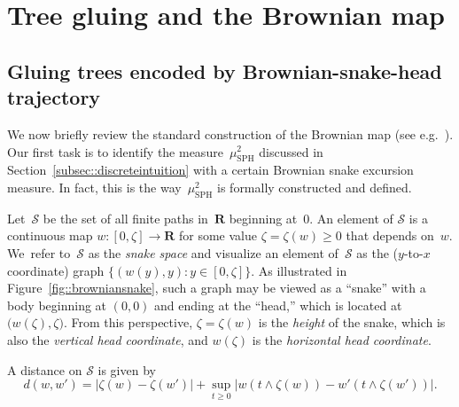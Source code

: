 \documentclass[JEP,XML,SOM,Unicode]{cedram}
\let\mathcal\mathscr
\let\oldS\S
\theoremstyle{plain}
\numberwithin{theorem}{section}
\theoremstyle{definition}
\newcommand{\snake}{{\mathcal S}}
\newcommand{\R}{\mathbf{R}}
\renewcommand{\S}{{\mathbf S}}
\newcommand{\mustwo}{\mu_{\mathrm{SPH}}^2}
\begin{document}
\section{Tree gluing and the Brownian map}
\label{sec::brownianmap}

\subsection{Gluing trees encoded by Brownian-snake-head trajectory}
\label{subsec::spheresassymetric}

We now briefly review the standard construction of the Brownian map (see e.g.\ \cite[\oldS 3.4]{legall2014icm}). Our first task is to identify the measure~$\mustwo$ discussed in Section~\ref{subsec::discreteintuition} with a certain Brownian snake excursion measure. In fact, this is the way~$\mustwo$ is formally constructed and defined.

Let~$\snake$ be the set of all finite paths in~$\R$ beginning at~$0$. An element of $\snake$ is a continuous map $w \colon [0, \zeta] \to \R$ for some value $\zeta = \zeta(w) \geq 0$ that depends on~$w$. We~refer to~$\snake$ as the \emph{snake space} and visualize an element of~$\snake$ as the ($y$-to-$x$ coordinate) graph $\{ (w(y), y): y \in [0,\zeta] \}$. As illustrated in Figure~\ref{fig::browniansnake}, such a graph may be viewed as a ``snake'' with a body beginning at $(0,0)$ and ending at the ``head,'' which is located at $\bigl(w(\zeta), \zeta \bigr)$. From this perspective, $\zeta = \zeta(w)$ is the \emph{height} of the snake, which is also the \emph{vertical head coordinate}, and $w(\zeta)$ is the \emph{horizontal head coordinate}.

A distance on $\snake$ is given by
\begin{equation}
\label{eqn::snake_metric}
d(w,w') = |\zeta(w) - \zeta(w')| + \sup_{t \geq 0} | w(t \wedge \zeta(w)) - w'(t \wedge \zeta(w'))|.
\end{equation}
\end{document}
